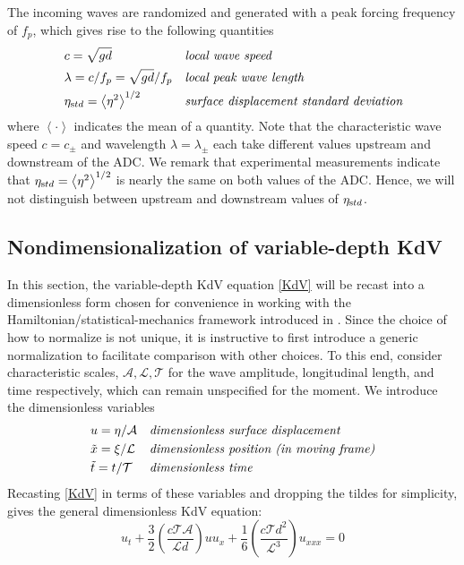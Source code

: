 \documentclass[11pt]{article}
\newcommand{\mean}[1]{\left< #1 \right>}
\newcommand{\freqp}{f_p}
\newcommand{\etastd}{\eta_{\text std}}
\newcommand{\depth}{d}
\newcommand{\lam}{\lambda}
\newcommand{\lamupdn}{\lam_{\pm}}
\newcommand{\ampscale}{\mathcal{A}}
\newcommand{\lengthscale}{\mathcal{L}}
\newcommand{\timescale}{\mathcal{T}}
\begin{document}
The incoming waves are randomized and generated with a peak forcing frequency of $\freqp$, which gives rise to the following quantities
\begin{align}
&c = \sqrt{g \depth}
&&\mbox{\em local wave speed} \\
&\lam = c/\freqp = \sqrt{g \depth} / \freqp
&&\mbox{\em local peak wave length} \\
&\etastd = \mean{\eta^2}^{1/2} 
&&\mbox{\em surface displacement standard deviation} \\
\end{align}
where $\mean{\cdot}$ indicates the mean of a quantity. 
Note that the characteristic wave speed $c = c_{\pm}$ and wavelength $\lam = \lamupdn$ each take different values upstream and downstream of the ADC. We remark that experimental measurements indicate that $\etastd = \mean{\eta^2}^{1/2}$ is nearly the same on both values of the ADC. Hence, we will not distinguish between upstream and downstream values of $\etastd$.

\subsection{Nondimensionalization of variable-depth KdV}

In this section, the variable-depth KdV equation \eqref{KdV} will be recast into a dimensionless form chosen for convenience in working with the Hamiltonian/statistical-mechanics framework introduced in \cite{majda2019statistical}. Since the choice of how to normalize is not unique, it is instructive to first introduce a generic normalization to facilitate comparison with other choices. To this end, consider characteristic scales, $\ampscale, \lengthscale, \timescale$ for the wave amplitude, longitudinal length, and time respectively, which can remain unspecified for the moment. We introduce the dimensionless variables
\begin{align}
&u = \eta / \ampscale
&&\mbox{\em dimensionless surface displacement} \\
&\tilde{x} = \xi / \lengthscale
&&\mbox{\em dimensionless position (in moving frame)} \\
&\tilde{t} = t / \timescale
&&\mbox{\em dimensionless time}
\end{align}
Recasting \eqref{KdV} in terms of these variables and dropping the tildes for simplicity, gives the general dimensionless KdV equation:
\begin{equation}
u_t + \frac{3}{2} \left( \frac{c \timescale \ampscale}{\lengthscale \depth} \right) u u_x 
+ \frac{1}{6} \left( \frac{c \timescale \depth^2}{\lengthscale^3} \right) u_{xxx} = 0
\end{equation}
\end{document}

